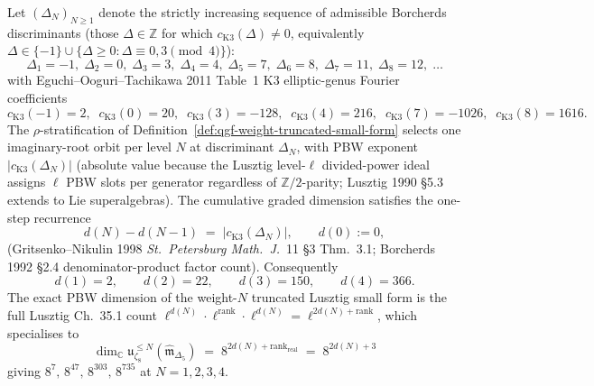 \begin{proposition}
\label{prop:qgf-truncation-dims}
Let $(\Delta_N)_{N\ge 1}$ denote the strictly increasing sequence of
admissible Borcherds discriminants (those $\Delta\in\mathbb Z$ for
which $c_{\mathrm{K3}}(\Delta)\neq 0$, equivalently
$\Delta\in\{-1\}\cup\{\Delta\ge 0:\Delta\equiv 0,3\pmod 4\}$):
\[
 \Delta_1 = -1,\;\Delta_2 = 0,\;\Delta_3 = 3,\;\Delta_4 = 4,\;
 \Delta_5 = 7,\;\Delta_6 = 8,\;\Delta_7 = 11,\;\Delta_8 = 12,\;\ldots
\]
with Eguchi--Ooguri--Tachikawa 2011 Table~1 K3 elliptic-genus Fourier
coefficients
\[
 c_{\mathrm{K3}}(-1) = 2,\;\;
 c_{\mathrm{K3}}(0) = 20,\;\;
 c_{\mathrm{K3}}(3) = -128,\;\;
 c_{\mathrm{K3}}(4) = 216,\;\;
 c_{\mathrm{K3}}(7) = -1026,\;\;
 c_{\mathrm{K3}}(8) = 1616.
\]
The $\rho$-stratification of
Definition~\ref{def:qgf-weight-truncated-small-form} selects one
imaginary-root orbit per level $N$ at discriminant $\Delta_N$, with
PBW exponent $|c_{\mathrm{K3}}(\Delta_N)|$ (absolute value because the
Lusztig level-$\ell$ divided-power ideal assigns $\ell$ PBW slots per
generator regardless of $\mathbb Z/2$-parity; Lusztig 1990 \S5.3
extends to Lie superalgebras). The cumulative graded dimension
satisfies the one-step recurrence
\[
 d(N) - d(N-1) \;=\; |c_{\mathrm{K3}}(\Delta_N)|,
 \qquad d(0) := 0,
\]
(Gritsenko--Nikulin 1998 \emph{St.~Petersburg Math.~J.}~11 \S3 Thm.~3.1;
Borcherds 1992 \S2.4 denominator-product factor count). Consequently
\[
 d(1) = 2,\qquad
 d(2) = 22,\qquad
 d(3) = 150,\qquad
 d(4) = 366.
\]
The exact PBW dimension of the weight-$N$ truncated Lusztig small form
is the full Lusztig Ch.~35.1 count
$\ell^{d(N)}\cdot\ell^{\mathrm{rank}}\cdot\ell^{d(N)}
= \ell^{2d(N)+\mathrm{rank}}$, which specialises to
\[
 \boxed{\;
 \dim_{\mathbb C}\mathfrak u_{\zeta_8}^{\leq N}(\widehat{\mathfrak m}_{\Delta_5})
 \;=\;
 8^{2d(N)+\mathrm{rank}_{\mathrm{real}}}
 \;=\;
 8^{2d(N)+3}
 \;}
\]
giving $8^{7},\,8^{47},\,8^{303},\,8^{735}$ at $N = 1,2,3,4$.
\end{proposition}


